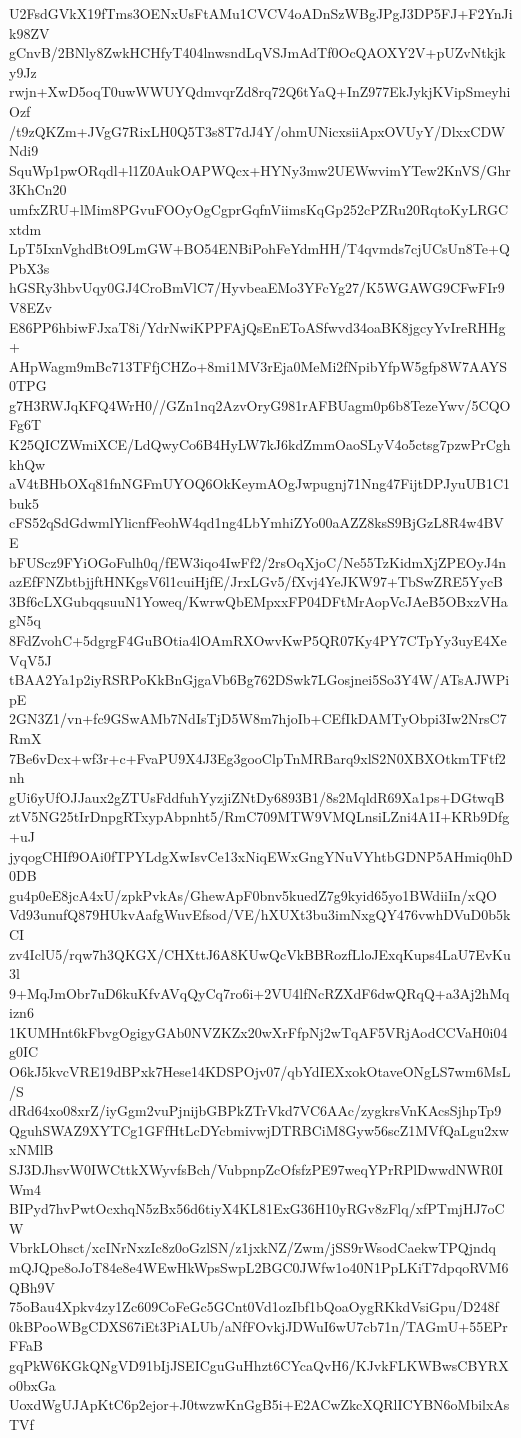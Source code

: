 U2FsdGVkX19fTms3OENxUsFtAMu1CVCV4oADnSzWBgJPgJ3DP5FJ+F2YnJik98ZV
gCnvB/2BNly8ZwkHCHfyT404lnwsndLqVSJmAdTf0OcQAOXY2V+pUZvNtkjky9Jz
rwjn+XwD5oqT0uwWWUYQdmvqrZd8rq72Q6tYaQ+InZ977EkJykjKVipSmeyhiOzf
/t9zQKZm+JVgG7RixLH0Q5T3s8T7dJ4Y/ohmUNicxsiiApxOVUyY/DlxxCDWNdi9
SquWp1pwORqdl+l1Z0AukOAPWQcx+HYNy3mw2UEWwvimYTew2KnVS/Ghr3KhCn20
umfxZRU+lMim8PGvuFOOyOgCgprGqfnViimsKqGp252cPZRu20RqtoKyLRGCxtdm
LpT5IxnVghdBtO9LmGW+BO54ENBiPohFeYdmHH/T4qvmds7cjUCsUn8Te+QPbX3s
hGSRy3hbvUqy0GJ4CroBmVlC7/HyvbeaEMo3YFcYg27/K5WGAWG9CFwFIr9V8EZv
E86PP6hbiwFJxaT8i/YdrNwiKPPFAjQsEnEToASfwvd34oaBK8jgcyYvIreRHHg+
AHpWagm9mBc713TFfjCHZo+8mi1MV3rEja0MeMi2fNpibYfpW5gfp8W7AAYS0TPG
g7H3RWJqKFQ4WrH0//GZn1nq2AzvOryG981rAFBUagm0p6b8TezeYwv/5CQOFg6T
K25QICZWmiXCE/LdQwyCo6B4HyLW7kJ6kdZmmOaoSLyV4o5ctsg7pzwPrCghkhQw
aV4tBHbOXq81fnNGFmUYOQ6OkKeymAOgJwpugnj71Nng47FijtDPJyuUB1C1buk5
cFS52qSdGdwmlYlicnfFeohW4qd1ng4LbYmhiZYo00aAZZ8ksS9BjGzL8R4w4BVE
bFUScz9FYiOGoFulh0q/fEW3iqo4IwFf2/2rsOqXjoC/Ne55TzKidmXjZPEOyJ4n
azEfFNZbtbjjftHNKgsV6l1cuiHjfE/JrxLGv5/fXvj4YeJKW97+TbSwZRE5YycB
3Bf6cLXGubqqsuuN1Yoweq/KwrwQbEMpxxFP04DFtMrAopVcJAeB5OBxzVHagN5q
8FdZvohC+5dgrgF4GuBOtia4lOAmRXOwvKwP5QR07Ky4PY7CTpYy3uyE4XeVqV5J
tBAA2Ya1p2iyRSRPoKkBnGjgaVb6Bg762DSwk7LGosjnei5So3Y4W/ATsAJWPipE
2GN3Z1/vn+fc9GSwAMb7NdIsTjD5W8m7hjoIb+CEfIkDAMTyObpi3Iw2NrsC7RmX
7Be6vDcx+wf3r+c+FvaPU9X4J3Eg3gooClpTnMRBarq9xlS2N0XBXOtkmTFtf2nh
gUi6yUfOJJaux2gZTUsFddfuhYyzjiZNtDy6893B1/8s2MqldR69Xa1ps+DGtwqB
ztV5NG25tIrDnpgRTxypAbpnht5/RmC709MTW9VMQLnsiLZni4A1I+KRb9Dfg+uJ
jyqogCHIf9OAi0fTPYLdgXwIsvCe13xNiqEWxGngYNuVYhtbGDNP5AHmiq0hD0DB
gu4p0eE8jcA4xU/zpkPvkAs/GhewApF0bnv5kuedZ7g9kyid65yo1BWdiiIn/xQO
Vd93unufQ879HUkvAafgWuvEfsod/VE/hXUXt3bu3imNxgQY476vwhDVuD0b5kCI
zv4IclU5/rqw7h3QKGX/CHXttJ6A8KUwQcVkBBRozfLloJExqKups4LaU7EvKu3l
9+MqJmObr7uD6kuKfvAVqQyCq7ro6i+2VU4lfNcRZXdF6dwQRqQ+a3Aj2hMqizn6
1KUMHnt6kFbvgOgigyGAb0NVZKZx20wXrFfpNj2wTqAF5VRjAodCCVaH0i04g0IC
O6kJ5kvcVRE19dBPxk7Hese14KDSPOjv07/qbYdIEXxokOtaveONgLS7wm6MsL/S
dRd64xo08xrZ/iyGgm2vuPjnijbGBPkZTrVkd7VC6AAc/zygkrsVnKAcsSjhpTp9
QguhSWAZ9XYTCg1GFfHtLcDYcbmivwjDTRBCiM8Gyw56scZ1MVfQaLgu2xwxNMlB
SJ3DJhsvW0IWCttkXWyvfsBch/VubpnpZcOfsfzPE97weqYPrRPlDwwdNWR0IWm4
BIPyd7hvPwtOcxhqN5zBx56d6tiyX4KL81ExG36H10yRGv8zFlq/xfPTmjHJ7oCW
VbrkLOhsct/xcINrNxzIc8z0oGzlSN/z1jxkNZ/Zwm/jSS9rWsodCaekwTPQjndq
mQJQpe8oJoT84e8e4WEwHkWpsSwpL2BGC0JWfw1o40N1PpLKiT7dpqoRVM6QBh9V
75oBau4Xpkv4zy1Zc609CoFeGc5GCnt0Vd1ozIbf1bQoaOygRKkdVsiGpu/D248f
0kBPooWBgCDXS67iEt3PiALUb/aNfFOvkjJDWuI6wU7cb71n/TAGmU+55EPrFFaB
gqPkW6KGkQNgVD91bIjJSEICguGuHhzt6CYcaQvH6/KJvkFLKWBwsCBYRXo0bxGa
UoxdWgUJApKtC6p2ejor+J0twzwKnGgB5i+E2ACwZkcXQRlICYBN6oMbilxAsTVf
